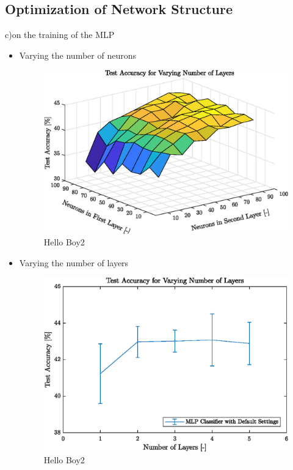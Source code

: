 \subsection{Optimization of Network Structure}\label{subsec:netStruct}
c)on the training of the MLP    
\begin{itemize}
   	\item Varying the number of neurons	
   	
	\begin{figure}[h!]
   		 \centering	  		
   		 \includegraphics{images/surfacelayers}
   		 \caption{Hello Boy2}
   		 \label{fig:surfaceLayers}
    \end{figure}
   	
	\item Varying the number of layers
	
	  	\begin{figure}[h!]
	  		\centering	  		
	  		\includegraphics{images/numberlayers}
	  		\caption{Hello Boy2}
	  		\label{fig:test2}
	  	\end{figure}	
\end{itemize}

